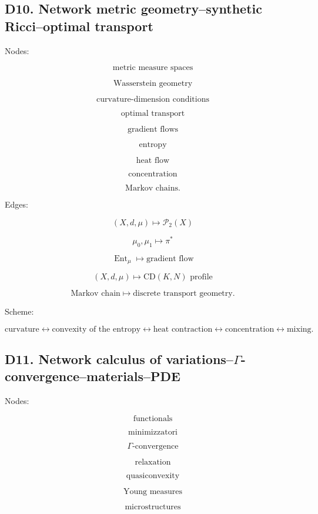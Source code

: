 \documentclass[11pt]{article}
\begin{document}
\subsection{D10. Network metric geometry--synthetic Ricci--optimal transport}

Nodes:

\[
\text{metric measure spaces}
\]

\[
\text{Wasserstein geometry}
\]

\[
\text{curvature-dimension conditions}
\]

\[
\text{optimal transport}
\]

\[
\text{gradient flows}
\]

\[
\text{entropy}
\]

\[
\text{heat flow}
\]

\[
\text{concentration}
\]

\[
\text{Markov chains}.
\]

Edges:

\[
(X,d,\mu)\mapsto \mathcal P_2(X)
\]

\[
\mu_0,\mu_1\mapsto \pi^\ast
\]

\[
\operatorname{Ent}_\mu\mapsto \text{gradient flow}
\]

\[
(X,d,\mu)\mapsto \text{CD}(K,N)\text{ profile}
\]

\[
\text{Markov chain}\mapsto \text{discrete transport geometry}.
\]

Scheme:

\[
\text{curvature}
\leftrightarrow
\text{convexity of the entropy}
\leftrightarrow
\text{heat contraction}
\leftrightarrow
\text{concentration}
\leftrightarrow
\text{mixing}.
\]



\subsection{D11. Network calculus of variations--\(\Gamma\)-convergence--materials--PDE}

Nodes:

\[
\text{functionals}
\]

\[
\text{minimizzatori}
\]

\[
\Gamma\text{-convergence}
\]

\[
\text{relaxation}
\]

\[
\text{quasiconvexity}
\]

\[
\text{Young measures}
\]

\[
\text{microstructures}
\]
\end{document}
